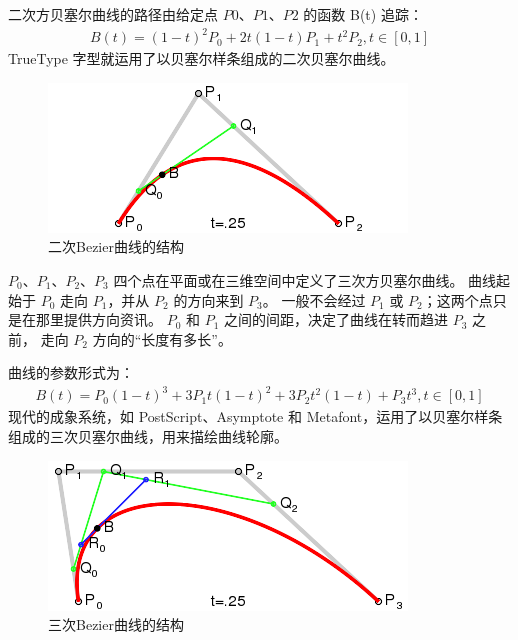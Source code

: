 \documentclass[a4paper,UTF8]{article}
\theoremstyle{definition}
\begin{document}
二次方贝塞尔曲线的路径由给定点
$P0、P1、P2$ 的函数 B(t) 追踪：
\begin{align}
B(t)=(1-t)^{2}P_0+2t(1-t)P_1+t^{2}{P}_2,t\in[0,1]
\end{align}
TrueType 字型就运用了以贝塞尔样条组成的二次贝塞尔曲线。
\begin{figure}[ht]
    \centering
    \includegraphics[width = .8\textwidth]{Bezier_2.png}
    \caption{二次Bezier曲线的结构}
    \label{fig:label4}
\end{figure}

$P_0、P_1、P_2、P_3$ 四个点在平面或在三维空间中定义了三次方贝塞尔曲线。
曲线起始于 $P_0$ 走向 $P_1$，并从 $P_2$ 的方向来到 $P_3$。
一般不会经过 $P_1$ 或 $P_2$；这两个点只是在那里提供方向资讯。
$P_0$ 和 $P_1$ 之间的间距，决定了曲线在转而趋进 $P_3$ 之前，
走向 $P_2$ 方向的“长度有多长”。

曲线的参数形式为：
\begin{align}
B(t)=P_0{(1-t)}^3+3P_1t{(1-t)}^2+3P_2t^2{(1-t)}+P_3t^3,t\in[0,1]
\end{align}
现代的成象系统，如 PostScript、Asymptote 和 Metafont，运用了以贝塞尔样条组成的三次贝塞尔曲线，用来描绘曲线轮廓。\cite{Bezier}
\begin{figure}[ht]
    \centering
    \includegraphics[width = .8\textwidth]{Bezier_3.png}
    \caption{三次Bezier曲线的结构}
    \label{fig:label5}
\end{figure}

\end{document}
